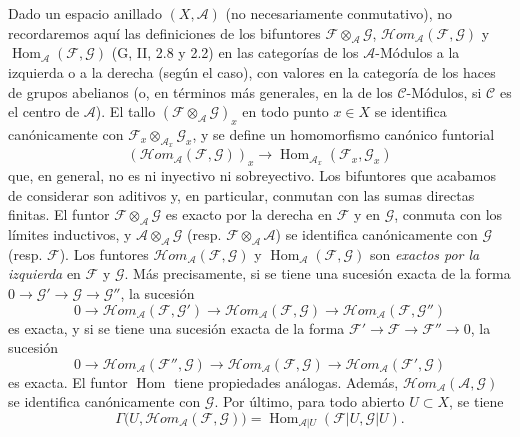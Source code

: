 \begin{env}[4.1.5]
\label{0.4.1.5-fr}
Dado un espacio anillado $(X,\mathcal{A})$ (no necesariamente conmutativo),
no recordaremos aquí las definiciones de los bifuntores
$\mathcal{F}\otimes_{\mathcal{A}}\mathcal{G}$,
$\mathcal{H}\!om_{\mathcal{A}}(\mathcal{F},\mathcal{G})$ y
$\operatorname{Hom}_{\mathcal{A}}(\mathcal{F},\mathcal{G})$
(G, II, 2.8 y 2.2) en las categorías de los $\mathcal{A}$-Módulos a la izquierda
o a la derecha (según el caso), con valores en la categoría de los haces de
grupos abelianos (o, en términos más
generales, en la de los $\mathcal{C}$-Módulos, si $\mathcal{C}$ es el centro de
$\mathcal{A}$). El tallo
$(\mathcal{F}\otimes_{\mathcal{A}}\mathcal{G})_x$ en todo punto $x\in X$
se identifica canónicamente con
$\mathcal{F}_x\otimes_{\mathcal{A}_x}\mathcal{G}_x$, y se define un
homomorfismo canónico funtorial
\[
  (\mathcal{H}\!om_{\mathcal{A}}(\mathcal{F},\mathcal{G}))_x
  \longrightarrow
  \operatorname{Hom}_{\mathcal{A}_x}(\mathcal{F}_x,\mathcal{G}_x)
\]
que, en general, no es ni inyectivo ni sobreyectivo. Los bifuntores que
acabamos de considerar son aditivos y, en particular, conmutan con las sumas
directas finitas. El funtor $\mathcal{F}\otimes_{\mathcal{A}}\mathcal{G}$ es
exacto por la derecha en $\mathcal{F}$ y en $\mathcal{G}$, conmuta con los
límites inductivos, y $\mathcal{A}\otimes_{\mathcal{A}}\mathcal{G}$
(resp. $\mathcal{F}\otimes_{\mathcal{A}}\mathcal{A}$) se identifica
canónicamente con $\mathcal{G}$ (resp. $\mathcal{F}$). Los funtores
$\mathcal{H}\!om_{\mathcal{A}}(\mathcal{F},\mathcal{G})$ y
$\operatorname{Hom}_{\mathcal{A}}(\mathcal{F},\mathcal{G})$ son
\emph{exactos por la izquierda} en $\mathcal{F}$ y $\mathcal{G}$.
Más precisamente, si se tiene una sucesión exacta de la forma
$0\to\mathcal{G}'\to\mathcal{G}\to\mathcal{G}''$, la sucesión
\[
  0\longrightarrow
  \mathcal{H}\!om_{\mathcal{A}}(\mathcal{F},\mathcal{G}')
  \longrightarrow
  \mathcal{H}\!om_{\mathcal{A}}(\mathcal{F},\mathcal{G})
  \longrightarrow
  \mathcal{H}\!om_{\mathcal{A}}(\mathcal{F},\mathcal{G}'')
\]
es exacta, y si se tiene una sucesión exacta de la forma
$\mathcal{F}'\to\mathcal{F}\to\mathcal{F}''\to0$, la sucesión
\[
  0\longrightarrow
  \mathcal{H}\!om_{\mathcal{A}}(\mathcal{F}'',\mathcal{G})
  \longrightarrow
  \mathcal{H}\!om_{\mathcal{A}}(\mathcal{F},\mathcal{G})
  \longrightarrow
  \mathcal{H}\!om_{\mathcal{A}}(\mathcal{F}',\mathcal{G})
\]
es exacta. El funtor $\operatorname{Hom}$ tiene propiedades análogas.
Además, $\mathcal{H}\!om_{\mathcal{A}}(\mathcal{A},\mathcal{G})$ se identifica
canónicamente con $\mathcal{G}$. Por último, para todo abierto $U\subset X$,
se tiene
\[
  \Gamma\bigl(U,\mathcal{H}\!om_{\mathcal{A}}(\mathcal{F},\mathcal{G})\bigr)
  =
  \operatorname{Hom}_{\mathcal{A}|U}(\mathcal{F}|U,\mathcal{G}|U).
\]


\end{env}
